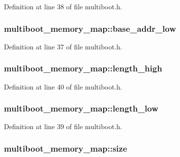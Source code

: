 Definition at line 38 of file multiboot.\-h.

\hypertarget{structmultiboot__memory__map_aaf761d2db0b02fc4308e98d5bb6666db}{
\subsubsection[{base\-\_\-addr\-\_\-low}]{ multiboot\-\_\-memory\-\_\-map\-::base\-\_\-addr\-\_\-low}}\label{structmultiboot__memory__map_aaf761d2db0b02fc4308e98d5bb6666db}


Definition at line 37 of file multiboot.\-h.

\hypertarget{structmultiboot__memory__map_a2877672a868d3d8f097d0f44790ee1c2}{
\subsubsection[{length\-\_\-high}]{ multiboot\-\_\-memory\-\_\-map\-::length\-\_\-high}}\label{structmultiboot__memory__map_a2877672a868d3d8f097d0f44790ee1c2}


Definition at line 40 of file multiboot.\-h.

\hypertarget{structmultiboot__memory__map_a8138f4682dc7e0736759a73edebc114b}{
\subsubsection[{length\-\_\-low}]{ multiboot\-\_\-memory\-\_\-map\-::length\-\_\-low}}\label{structmultiboot__memory__map_a8138f4682dc7e0736759a73edebc114b}


Definition at line 39 of file multiboot.\-h.

\hypertarget{structmultiboot__memory__map_ac0ad4b16395ba1e3d7101a6aa1be8ec4}{
\subsubsection[{size}]{ multiboot\-\_\-memory\-\_\-map\-::size}}\label{structmultiboot__memory__map_ac0ad4b16395ba1e3d7101a6aa1be8ec4}


